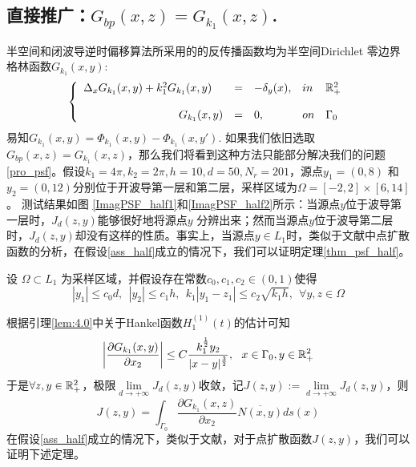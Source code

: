 \subsection{直接推广：$G_{bp}(x,z)=G_{k_1}(x,z)$.}
半空间和闭波导逆时偏移算法\cite{ch_ha,ch_cw}所采用的的反传播函数均为半空间Dirichlet 零边界格林函数$G_{k_1}(x,y)$:
\begin{eqnarray}
\left\{
\begin{array}{lllll}
 \Delta_xG_{k_1}(x,y)+k_1^2G_{k_1}(x,y)&=&-\delta_y(x),& in&\R^2_+\\
 & & & &\\
 \hspace{3cm}G_{k_1}(x,y)&=&0,&on&\Gamma_0
\end{array}
\right.
\end{eqnarray}
易知$G_{k_1}(x,y)=\Phi_{k_1}(x,y)-\Phi_{k_1}(x,y')$. 如果我们依旧选取$G_{bp}(x,z)=G_{k_1}(x,z)$，那么我们将看到这种方法只能部分解决我们的问题\ref{pro_psf}。假设$k_1=4\pi,k_2=2\pi,h=10,d=50,N_r=201$，源点$y_1=(0,8)$ 和$y_2=(0,12)$分别位于开波导第一层和第二层，采样区域为$\Omega=[-2,2]\times[6,14]$。 测试结果如图
\ref{ImagPSF_half1}和\ref{ImagPSF_half2}所示：当源点$y$位于波导第一层时，$J_d(z,y)$能够很好地将源点$y$ 分辨出来；然而当源点$y$位于波导第二层时，$J_d(z,y)$却没有这样的性质。事实上，当源点$y\in L_1$时，类似于文献\cite{ch_ha,ch_cw}中点扩散函数的分析，在假设\ref{ass_half}成立的情况下，我们可以证明定理\ref{thm_psf_half}。
\begin{assumption}\label{ass_half}
设 $\Omega\subset L_1$ 为采样区域，并假设存在常数$c_0,c_1,c_2\in(0,1)$使得
\begin{equation}
|y_1|\leq c_0d,\ \ |y_2|\leq c_1h,\ \ k_1|y_1-z_1|\leq c_2\sqrt{k_1h},\ \ \forall y,z\in\Omega
\end{equation}
\end{assumption}
根据引理\ref{lem:4.0}中关于Hankel函数$H_1^{(1)}(t)$的估计可知
\begin{equation}
 \left|\frac{\partial G_{k_1} (x,y)}{\partial x_2}\right|\leq C\frac{ k_1^{\frac{1}{2}}y_2}{|x-y|^{\frac{3}{2}}},\ \ x\in\Gamma_0,y\in\R^2_+
\end{equation}
于是$\forall z,y\in\mathbb{R}^2_+$，极限$\lim\limits_{d\rightarrow+\infty}J_d(z,y)$收敛，记$J(z,y):=\lim\limits_{d\rightarrow+\infty}J_d(z,y)$，则
\begin{equation}\label{psf_half}
  J(z,y)=\int_{\Gamma_0}\frac{\partial G_{k_1}(x,z)}{\partial x_2}\overline{N(x,y)}ds(x)
\end{equation}
在假设\ref{ass_half}成立的情况下，类似于文献\cite{ch_ha,ch_cw}，对于点扩散函数$J(z,y)$，我们可以证明下述定理。
